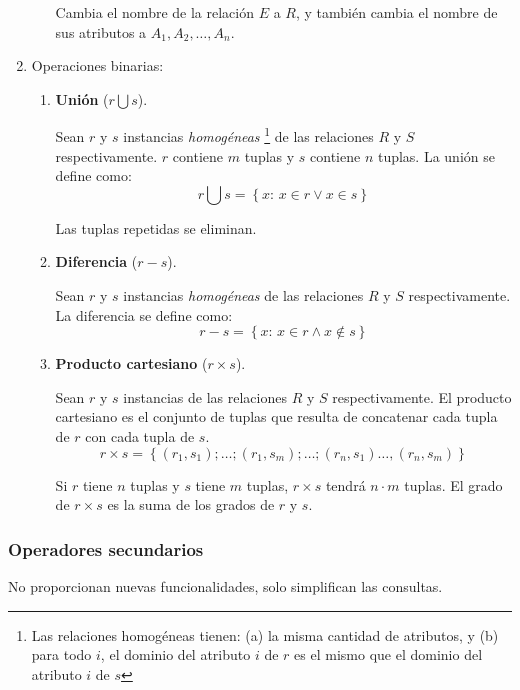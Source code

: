 \documentclass[a4paper, twoside]{article}
\begin{document}
\begin{enumerate}
\begin{enumerate}
		Cambia el nombre de la relación $E$ a $R$, y también cambia el nombre de sus atributos a $A_{1},A_{2},\dots,A_{n}$.
	\end{enumerate}

	\item Operaciones binarias:
	\begin{enumerate}
		\item \textbf{Unión} ($r\bigcup s$).

		Sean $r$ y $s$ instancias \emph{homogéneas}%
		\footnote{Las relaciones homogéneas tienen: (a) la misma cantidad de atributos, y (b) para todo $i$, el dominio del atributo $i$ de $r$ es el mismo que el dominio del atributo $i$ de $s$}%
		de las relaciones $R$ y $S$ respectivamente. $r$ contiene $m$ tuplas y $s$ contiene $n$ tuplas. La unión se define como:
		\[
			r\bigcup s=\left\{ x:\, x\in r\vee x\in s\right\} 
		\]

		Las tuplas repetidas se eliminan.

		\item \textbf{Diferencia} ($r-s$).

		Sean $r$ y $s$ instancias \emph{homogéneas }de las relaciones $R$ y $S$ respectivamente. La diferencia se define como:
		\[
			r-s=\left\{ x:\, x\in r\wedge x\not\in s\right\} 
		\]

		\item \textbf{Producto cartesiano} ($r\times s$). 

		Sean $r$ y $s$ instancias de las relaciones $R$ y $S$ respectivamente. El producto cartesiano es el conjunto de tuplas que resulta de concatenar cada tupla de $r$ con cada tupla de $s$.
		\[
			r\times s = \left\{ \left(r_{1},s_{1}\right);\ldots;\left(r_{1},s_{m}\right);\ldots;\left(r_{n},s_{1}\right)\ldots,\left(r_{n},s_{m}\right)\right\} 
		\]

		Si $r$ tiene $n$ tuplas y $s$ tiene $m$ tuplas, $r\times s$ tendrá $n\cdot m$ tuplas. El grado de $r\times s$ es la suma de los grados de $r$ y $s$.
	\end{enumerate}
\end{enumerate}

\subsubsection{Operadores secundarios}
No proporcionan nuevas funcionalidades, solo simplifican las consultas.
\end{document}
